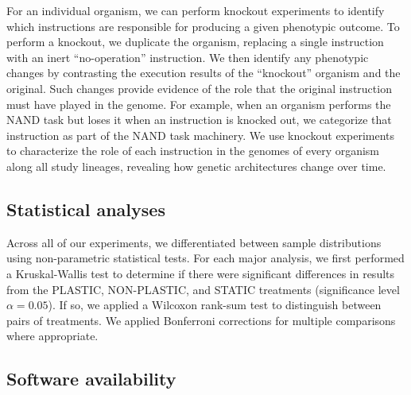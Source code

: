 For an individual organism, we can perform knockout experiments to identify which instructions are responsible for producing a given phenotypic outcome.
To perform a knockout, we duplicate the organism, replacing a single instruction with an inert ``no-operation'' instruction.
We then identify any phenotypic changes by contrasting the execution results of the ``knockout'' organism and the original.
Such changes provide evidence of the role that the original instruction must have played in the genome.
For example, when an organism performs the NAND task but loses it when an instruction is knocked out, we categorize that instruction as part of the NAND task machinery.
We use knockout experiments to characterize the role of each instruction in the genomes of every organism along all study lineages, revealing how genetic architectures change over time.

\subsection{Statistical analyses}

Across all of our experiments, we differentiated between sample distributions using non-parametric statistical tests.
For each major analysis, we first performed a Kruskal-Wallis test \citep{kruskal_use_1952} to 
determine if there were significant differences in results from the PLASTIC, NON-PLASTIC, and STATIC treatments (significance level $\alpha=0.05$).
If so, we applied a Wilcoxon rank-sum test \citep{kotz_individual_1992} to distinguish between pairs of treatments.
We applied Bonferroni corrections for multiple comparisons \citep{rice_analyzing_1989} where appropriate.

\subsection{Software availability}

